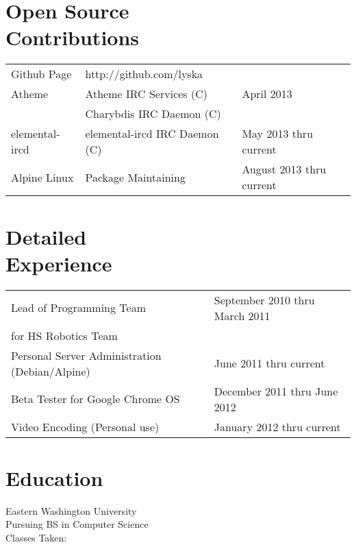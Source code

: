 \documentclass[line, margin]{res}
\begin{document}
\address{5539 Columbia Pike Apt 809 \\ Arlington, VA 22204 \\ +1 (425) 221-7761}

\begin{resume}

	\section{Open Source \\ Contributions}
	\begin{tabular}{l l l}
		Github Page & \hfill http://github.com/lyska & \\ [5pt]
		Atheme & \hfill Atheme IRC Services (C) & \hfill April 2013 \\ 
	 & \hfill Charybdis IRC Daemon (C) \\ [5pt]
		elemental-ircd & \hfill elemental-ircd IRC Daemon (C) & \hfill May 2013 thru current \\ [5pt]
		Alpine Linux & \hfill Package Maintaining & \hfill August 2013 thru current \\
	\end{tabular}

	\section{Detailed \\ Experience}
	\begin{tabular}{l l}
		Lead of Programming Team & \hfill September 2010 thru March 2011 \\ 
		for HS Robotics Team & \\ [6pt]
		Personal Server Administration (Debian/Alpine) & \hfill June 2011 thru current  \\ [6pt]
		Beta Tester for Google Chrome OS & \hfill December 2011 thru June 2012 \\ [6pt]
		Video Encoding (Personal use) & January 2012 thru current \\ [6pt]
	\end{tabular}


	\section{Education}

	Eastern Washington University \\ Pursuing BS in Computer Science \\
	Classes Taken:


\end{resume}
\end{document}
